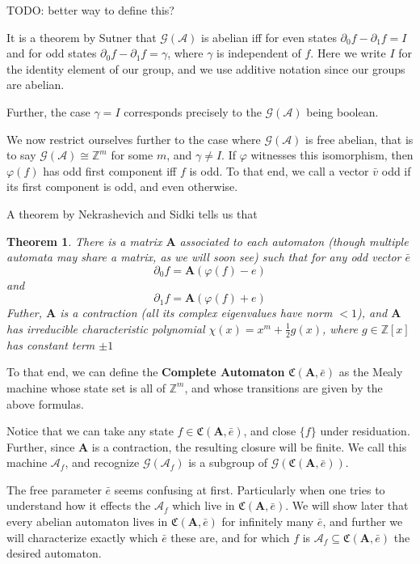 \documentclass[12pt]{article}
\newcommand{\A}{\mathcal{A}}
\newcommand{\G}{\mathcal{G}}
\newcommand{\Z}{\mathbb{Z}}
\newcommand{\2}{\textbf{2}}
\newcommand{\Am}{\textbf{A}}
\newcommand{\del}{\partial}
\renewcommand{\v}{\bar{v}}
\newtheorem{thm}{Theorem}
\begin{document}
TODO: better way to define this?

It is a theorem by Sutner that $\G(\A)$ is abelian iff for 
even states $\del_0 f - \del_1 f = I$ and for odd states
$\del_0 f - \del_1 f = \gamma$, where $\gamma$ is independent
of $f$. Here we write $I$ for the identity element of our group,
and we use additive notation since our groups are abelian.

Further, the case $\gamma = I$ corresponds precisely to the $\G(\A)$
being boolean.

We now restrict ourselves further to the case where $\G(\A)$ is 
free abelian, that is to say $\G(\A) \cong \Z^m$ for some $m$,
and $\gamma \not = I$.
If $\varphi$ witnesses this isomorphism, then $\varphi(f)$ has odd
first component iff $f$ is odd. To that end, we call a vector $\v$ odd
if its first component is odd, and even otherwise.

A theorem by Nekrashevich and Sidki tells us that

\begin{thm}
  There is a matrix $\Am$ associated to each automaton 
  (though multiple automata may share a matrix, as we will soon see)
  such that for any odd vector $\bar{e}$ 
  \[ \del_0 f = \Am (\varphi(f) - e) \] and
  \[ \del_1 f = \Am (\varphi(f) + e) \]
  Futher, $\Am$ is a contraction (all its complex eigenvalues have norm $<1$),
  and $\Am$ has irreducible characteristic polynomial 
  $\chi(x) = x^m + \frac{1}{2}g(x)$, 
  where $g \in \Z[x]$ has constant term $\pm 1$
\end{thm}

To that end, we can define the \textbf{Complete Automaton} 
$\mathfrak{C}(\Am, \bar{e})$ as the Mealy machine whose state set is all of
$\Z^m$, and whose transitions are given by the above formulas.

Notice that we can take any state $f \in \mathfrak{C}(\Am, \bar{e})$, 
and close $\{ f \}$ under residuation.
Further, since $\Am$ is a contraction, the resulting closure will be finite.
We call this machine $\A_f$, and recognize $\G(\A_f)$ is a subgroup of 
$\G(\mathfrak{C}(\Am, \bar{e}))$.

The free parameter $\bar{e}$ seems confusing at first. Particularly 
when one tries to understand how it effects the $\A_f$ which live in
$\mathfrak{C}(\Am, \bar{e})$. We will show later that every abelian automaton
lives in $\mathfrak{C}(\Am, \bar{e})$ for infinitely many $\bar{e}$, and
further we will characterize exactly which $\bar{e}$ these are, and for which
$f$ is $\A_f \subseteq \mathfrak{C}(\Am, \bar{e})$ the desired automaton.
\end{document}
